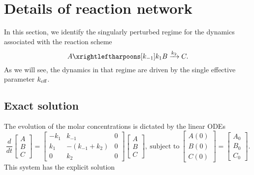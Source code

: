 
\section{Details of reaction network \label{app:abc}}

%
In this section, we identify the singularly perturbed regime for the dynamics associated with the reaction scheme
%
\[
  A \xrightleftharpoons[k_{-1}]{k_1} B \xrightarrow[]{k_2} C .
\]
%
As we will see, the dynamics in that regime are driven by the single effective parameter $k_\mathrm{eff}$.

\subsection{Exact solution}
%
The evolution of the molar concentrations is dictated by the linear ODEs
%
\[
 \frac{d}{dt}
\left[\begin{array}{c}
 A \\ B \\ C
\end{array}\right]
=
\left[\begin{array}{ccc}
 -k_1 & k_{-1} & 0 \\ k_1 & -(k_{-1}+k_2) & 0 \\ 0 & k_2 & 0
\end{array}\right]
%
\left[\begin{array}{c}
 A \\ B \\ C
\end{array}\right] ,
%
\ \mbox{subject to} \
%
\left[\begin{array}{c}
 A(0) \\ B(0) \\ C(0)
\end{array}\right]
=
\left[\begin{array}{c}
 A_0 \\ B_0 \\ C_0
\end{array}\right] .
\]
%
This system has the explicit solution
%
\be
